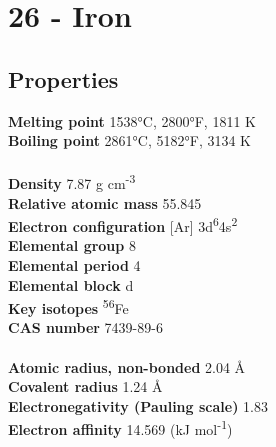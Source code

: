 \section{26 - Iron}
\label{sec:elem-iron}
\subsection{Properties}
\textbf{Melting point} 1538°C, 2800°F, 1811 K\\
\textbf{Boiling point} 2861°C, 5182°F, 3134 K\\
\\
\textbf{Density} 7.87 g cm\textsuperscript{-3}\\
\textbf{Relative atomic mass} 55.845\\
\textbf{Electron configuration} [Ar] 3d\textsuperscript{6}4s\textsuperscript{2}\\
\textbf{Elemental group} 8\\
\textbf{Elemental period} 4\\
\textbf{Elemental block} d\\
\textbf{Key isotopes} \textsuperscript{56}Fe\\
\textbf{CAS number} 7439-89-6\\
\\
\textbf{Atomic radius, non-bonded} 2.04 Å\\
\textbf{Covalent radius} 1.24 Å\\
\textbf{Electronegativity (Pauling scale)} 1.83\\
\textbf{Electron affinity} 14.569 (kJ mol\textsuperscript{-1})\\